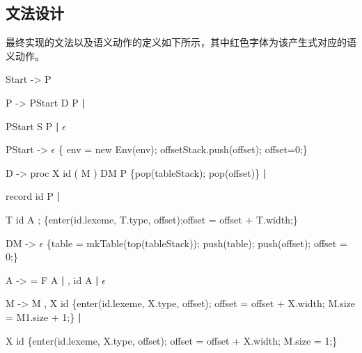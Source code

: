 \documentclass{ML}
\begin{document}
\subsection{文法设计}\label{sec:grammar}
最终实现的文法以及语义动作的定义如下所示，其中{\color{red}红色}字体为该产生式对应的语义动作。
\begin{enumerate}
    {\unicodefont \footnotesize
    \item Start -> P 
    \vspace{0.5cm}
    
    \item P -> PStart D P \textbf{|}
    
    \hspace{1cm}PStart S P \textbf{|} $\epsilon$
    
    \vspace{0.5cm}
    
    \item PStart -> $\epsilon$ {\color{red}\{ env = new Env(env); offsetStack.push(offset); offset=0;\}}
    \vspace{0.5cm}
    
    \item D -> proc X id ( M ) DM { P } {\color{red}\{pop(tableStack); pop(offset)\}} \textbf{|}
    
    \hspace{1cm} record id { P } \textbf{|}
    
    \hspace{1cm} T id A ; {\color{red}\{enter(id.lexeme, T.type, offset);offset = offset + T.width;\}}
        \vspace{0.5cm}
    
    \item DM -> $\epsilon$ {\color{red}\{table = mkTable(top(tableStack)); push(table); push(offset); offset = 0;\}}
    \vspace{0.1cm}
    
    \item A -> = F A \textbf{|} , id A \textbf{|} $\epsilon$
    \vspace{0.5cm}
    
    \item M -> M , X id {\color{red}\{enter(id.lexeme, X.type, offset); offset = offset + X.width; M.size = M1.size + 1;\}} \textbf{|} 
    
    \hspace{0.5cm}X id {\color{red}\{enter(id.lexeme, X.type, offset); offset = offset + X.width; M.size = 1;\}}
    \vspace{0.1cm}
    
}
\end{enumerate}
\end{document}
